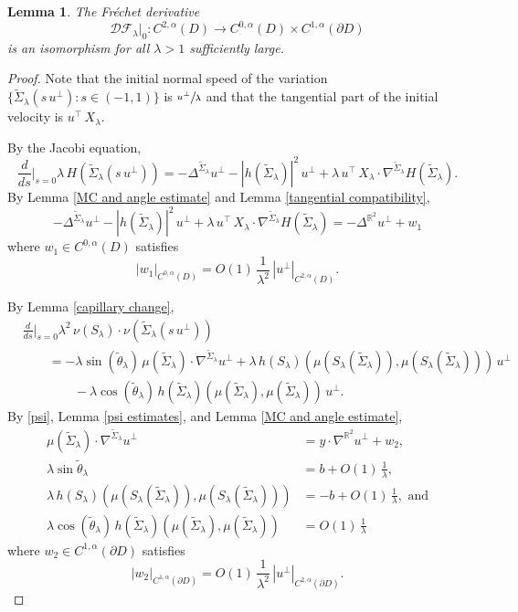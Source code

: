 \documentclass[11pt]{amsart}
\newtheorem{lem}[prop]{Lemma}
\begin{document}
\begin{lem} \label{isomorphism} 
The Fr\'echet derivative
	$$
	\mathcal{D}\mathcal{F}_{\lambda}|_0:C^{2,\alpha}(D)\to C^{0,\alpha}(D)\times  C^{1,\alpha}(\partial D)
	$$
	is an isomorphism for all $\lambda>1$ sufficiently large.
\end{lem}
\begin{proof}
	Note that the initial normal speed of the variation $\{\tilde \Sigma_\lambda(s\,u^\perp):s\in(-1,1)\}$  is $\sfrac{u^\perp}{\lambda}$ and that the tangential part of the initial velocity is $u^\top\,X_\lambda$. 
	
	By the Jacobi equation,
	$$
	\frac{d}{ds}\bigg|_{s=0}\lambda\, H(\tilde \Sigma_\lambda(s\,u^\perp))=-\Delta^{\tilde \Sigma_\lambda}u^\perp-|h(\tilde \Sigma_\lambda)|^2\,u^\perp+\lambda\,u^\top\,X_\lambda\cdot\nabla^{\tilde \Sigma_\lambda} H(\tilde \Sigma_\lambda).
	$$
	By Lemma \ref{MC and angle estimate} and Lemma \ref{tangential compatibility},
	$$
	-\Delta^{\tilde \Sigma_\lambda}u^\perp-|h(\tilde \Sigma_\lambda)|^2\,u^\perp+\lambda\,u^\top\,X_\lambda\cdot \nabla^{\tilde \Sigma_\lambda} H(\tilde \Sigma_\lambda)=-\Delta^{\mathbb{R}^2}u^\perp+w_1
	$$
	where $w_1\in C^{0,\alpha}(D)$ satisfies 
	$$
	|w_1|_{C^{0,\alpha}(D)}=O(1)\,\frac{1}{\lambda^2}\,|u^\perp|_{C^{2,\alpha}(D)}.
	$$ 
	
	By Lemma \ref{capillary change},
	\begin{align*} 
	&\frac{d}{ds}\bigg|_{s=0}\lambda^2\,\nu(S_\lambda)\cdot\nu(\tilde\Sigma_{\lambda}(s\,u^\perp))
	\\&\qquad =-\lambda\sin(\tilde \theta_{\lambda})\,\mu(\tilde \Sigma_{\lambda})\cdot\nabla^{\tilde \Sigma_{\lambda}}u^\perp +\lambda\,h(S_\lambda)(\mu(S_\lambda(\tilde \Sigma_{\lambda})),\mu(S_\lambda(\tilde \Sigma_{\lambda})))\,u^\perp
	\\&\qquad\qquad-\lambda\cos(\tilde \theta_{\lambda})\,h(\tilde \Sigma_{\lambda})(\mu(\tilde \Sigma_{\lambda}),\mu(\tilde \Sigma_{\lambda}))\, u^\perp.
	\end{align*} 
	By \eqref{psi}, Lemma \ref{psi estimates}, and Lemma \ref{MC and angle estimate},
\begin{align*} 
\mu(\tilde \Sigma_{\lambda})\cdot \nabla^{\tilde \Sigma_{\lambda}} u^\perp&=y\cdot \nabla^{\mathbb{R}^2} u^\perp+w_2,\\
	\lambda\sin\tilde \theta_{\lambda}&=b+O(1)\,\frac{1}{\lambda},\\
	\lambda\,h(S_\lambda)(\mu(S_\lambda(\tilde \Sigma_{\lambda})),\mu(S_\lambda(\tilde \Sigma_{\lambda})))&=-b+O(1)\,\frac{1}{\lambda},\text{ and}\\
	\lambda\cos(\tilde\theta_{\lambda})\,h(\tilde \Sigma_{\lambda})(\mu(\tilde \Sigma_{\lambda}),\mu(\tilde \Sigma_{\lambda}))&=O(1)\,\frac{1}{\lambda}
	\end{align*} 
		where $w_2\in C^{1,\alpha}(\partial D)$ satisfies 
	$$
	|w_2|_{C^{1,\alpha}(\partial D)}=O(1)\,\frac{1}{\lambda^2}\,|u^\perp|_{C^{2,\alpha}(\partial D)}.
	$$ 


\end{proof}
\end{document}
